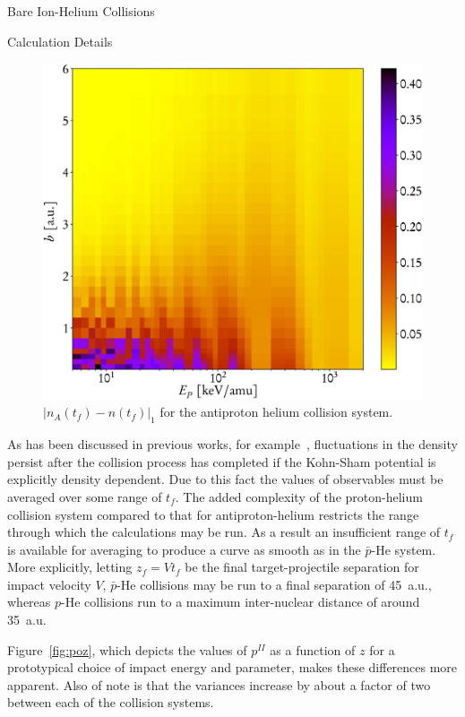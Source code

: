 \documentclass[letterpaper, 11 pt]{report}
\begin{document}
\begin{chapter}{Bare Ion-Helium Collisions \label{chap:p-he2p-he}}
\begin{section}{Calculation Details \label{sec:phe2p-det}}
\begin{figure}[t]
\begin{minipage}{.49\linewidth}
            \centering
            \includegraphics[width = \linewidth]{./images/dendiff.eps}
            \caption[Density difference]
                   {$\left| n_A(t_f) - n (t_f)\right|_1$ for the antiproton
                    helium collision system. \label{fig:l1}}
         \end{minipage}
      \end{figure}

      As has been discussed in previous works, for example~\cite{microresp,pbarhe}, fluctuations in the
      density persist after the collision process has completed if the Kohn-Sham potential is explicitly
      density dependent. Due to this fact the values of observables must be averaged over some range of
      $t_f$. The added complexity of the proton-helium collision system compared to that for
      antiproton-helium restricts the range through which the calculations may be run. As a result
      an insufficient range of $t_f$ is available for averaging to produce a curve as smooth as in the
      $\bar{p}$-He system. More explicitly, letting $z_f = V t_f$ be the final target-projectile
      separation for impact velocity $V$, $\bar{p}$-He collisions may be run to a final separation of
      45~a.u., whereas $p$-He collisions run to a maximum inter-nuclear distance of around 35~a.u.

      Figure~\ref{fig:poz}, which depicts the values of $p^{II}$ as a function of $z$ for a prototypical
      choice of impact energy and parameter, makes these differences more apparent. Also of note is that
      the variances increase by about a factor of two between each of the collision systems.


\end{section}
\end{chapter}
\end{document}
